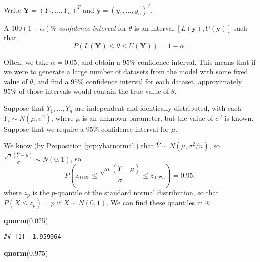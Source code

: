 \documentclass[]{book}
\newenvironment{Shaded}{\begin{snugshade}}{\end{snugshade}}
\newcommand{\KeywordTok}[1]{\textcolor[rgb]{0.13,0.29,0.53}{\textbf{#1}}}
\newcommand{\FloatTok}[1]{\textcolor[rgb]{0.00,0.00,0.81}{#1}}
\newcommand{\NormalTok}[1]{#1}
\theoremstyle{definition}
\theoremstyle{definition}
\theoremstyle{definition}
\theoremstyle{remark}
\let\BeginKnitrBlock\begin \let\EndKnitrBlock\end
\begin{document}
Write \(\bm Y = (Y_1, \ldots, Y_n)^T\) and
\(\bm y = (y_1, \ldots, y_n)^T\).

\BeginKnitrBlock{definition}
\protect\hypertarget{def:unnamed-chunk-102}{}{\label{def:unnamed-chunk-102}
}A \(100(1- \alpha)\%\) \emph{confidence interval} for \(\theta\) is an
interval \([L(\bm y), U(\bm y)]\) such that
\[P\left(L(\bm Y) \leq \theta \leq U(\bm Y)\right) = 1 - \alpha.\]
\EndKnitrBlock{definition}

Often, we take \(\alpha = 0.05\), and obtain a \(95\%\) confidence
interval. This means that if we were to generate a large number of
datasets from the model with some fixed value of \(\theta\), and find a
\(95\%\) confidence interval for each dataset, approximately \(95\%\) of
those intervals would contain the true value of \(\theta\).

\BeginKnitrBlock{example}[Normal mean, known variance]
\protect\hypertarget{exm:cinormmean}{}{\label{exm:cinormmean}
\iffalse (Normal mean, known variance) \fi{} }Suppose that
\(Y_1, \ldots, Y_n\) are independent and identically distributed, with
each \(Y_i \sim N(\mu, \sigma^2)\), where \(\mu\) is an unknown
parameter, but the value of \(\sigma^2\) is known. Suppose that we
require a \(95 \%\) confidence interval for \(\mu\).

We know (by Proposition \ref{prp:ybarnormal}) that
\(\bar Y \sim N(\mu, \sigma^2 / n)\), so
\(\frac{\sqrt{n}(\bar Y - \mu)}{\sigma} \sim N(0, 1)\), so
\[P\left(z_{0.025} \leq \frac{\sqrt{n}(\bar Y - \mu)}{\sigma} \leq z_{0.975}\right) = 0.95.\]
where \(z_{p}\) is the \(p\)-quantile of the standard normal
distribution, so that \(P(X \leq z_p) = p\) if \(X \sim N(0, 1)\). We
can find these quantiles in \texttt{R}:
\EndKnitrBlock{example}

\begin{Shaded}
\begin{Highlighting}[]
\KeywordTok{qnorm}\NormalTok{(}\FloatTok{0.025}\NormalTok{)}
\end{Highlighting}
\end{Shaded}

\begin{verbatim}
## [1] -1.959964
\end{verbatim}

\begin{Shaded}
\begin{Highlighting}[]
\KeywordTok{qnorm}\NormalTok{(}\FloatTok{0.975}\NormalTok{)}
\end{Highlighting}
\end{Shaded}
\end{document}
